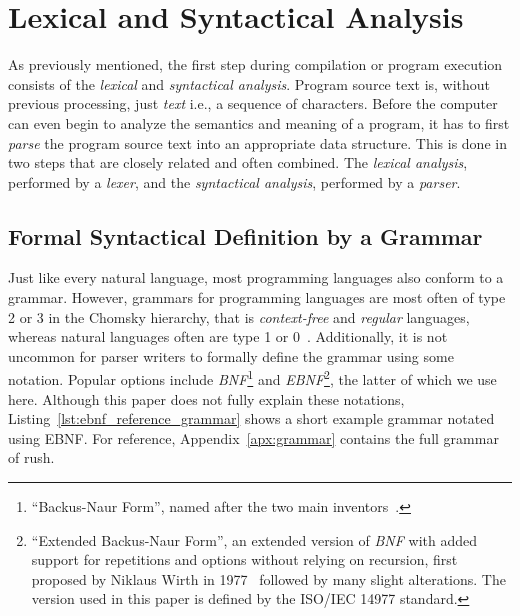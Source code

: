 \section{Lexical and Syntactical Analysis}

As previously mentioned, the first step during compilation or program execution consists of the \emph{lexical} and \emph{syntactical analysis}.
Program source text is, without previous processing, just \emph{text} i.e., a sequence of characters.
Before the computer can even begin to analyze the semantics and meaning of a program, it has to first \emph{parse} the program source text into an appropriate data structure.
This is done in two steps that are closely related and often combined.
The \emph{lexical analysis}, performed by a \emph{lexer}, and the \emph{syntactical analysis}, performed by a \emph{parser}.

\subsection{Formal Syntactical Definition by a Grammar}

Just like every natural language, most programming languages also conform to a grammar.
However, grammars for programming languages are most often of type 2 or 3 in the Chomsky hierarchy, that is \emph{context-free} and \emph{regular} languages, whereas natural languages often are type 1 or 0~\cite[p.~24]{Watson2017}.
Additionally, it is not uncommon for parser writers to formally define the grammar using some notation.
Popular options include \emph{BNF}\footnote{\enquote{Backus-Naur Form}, named after the two main inventors~\cite{Backus1960}.} and \emph{EBNF}\footnote{\enquote{Extended Backus-Naur Form}, an extended version of \emph{BNF} with added support for repetitions and options without relying on recursion, first proposed by Niklaus Wirth in 1977~\cite{Wirth1977} followed by many slight alterations. The version used in this paper is defined by the ISO/IEC 14977 standard.}, the latter of which we use here.
Although this paper does not fully explain these notations, Listing~\ref{lst:ebnf_reference_grammar} shows a short example grammar notated using EBNF.
For reference, Appendix~\ref{apx:grammar} contains the full grammar of rush.


